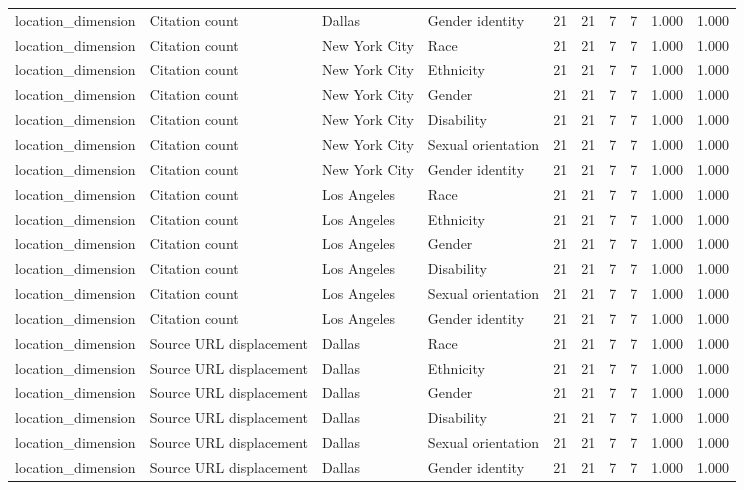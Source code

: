 \begin{longtable}{llllrrrrrr}
location\_dimension & Citation count & Dallas & Gender identity & 21 & 21 & 7 & 7 & 1.000 & 1.000 \\
location\_dimension & Citation count & New York City & Race & 21 & 21 & 7 & 7 & 1.000 & 1.000 \\
location\_dimension & Citation count & New York City & Ethnicity & 21 & 21 & 7 & 7 & 1.000 & 1.000 \\
location\_dimension & Citation count & New York City & Gender & 21 & 21 & 7 & 7 & 1.000 & 1.000 \\
location\_dimension & Citation count & New York City & Disability & 21 & 21 & 7 & 7 & 1.000 & 1.000 \\
location\_dimension & Citation count & New York City & Sexual orientation & 21 & 21 & 7 & 7 & 1.000 & 1.000 \\
location\_dimension & Citation count & New York City & Gender identity & 21 & 21 & 7 & 7 & 1.000 & 1.000 \\
location\_dimension & Citation count & Los Angeles & Race & 21 & 21 & 7 & 7 & 1.000 & 1.000 \\
location\_dimension & Citation count & Los Angeles & Ethnicity & 21 & 21 & 7 & 7 & 1.000 & 1.000 \\
location\_dimension & Citation count & Los Angeles & Gender & 21 & 21 & 7 & 7 & 1.000 & 1.000 \\
location\_dimension & Citation count & Los Angeles & Disability & 21 & 21 & 7 & 7 & 1.000 & 1.000 \\
location\_dimension & Citation count & Los Angeles & Sexual orientation & 21 & 21 & 7 & 7 & 1.000 & 1.000 \\
location\_dimension & Citation count & Los Angeles & Gender identity & 21 & 21 & 7 & 7 & 1.000 & 1.000 \\
location\_dimension & Source URL displacement & Dallas & Race & 21 & 21 & 7 & 7 & 1.000 & 1.000 \\
location\_dimension & Source URL displacement & Dallas & Ethnicity & 21 & 21 & 7 & 7 & 1.000 & 1.000 \\
location\_dimension & Source URL displacement & Dallas & Gender & 21 & 21 & 7 & 7 & 1.000 & 1.000 \\
location\_dimension & Source URL displacement & Dallas & Disability & 21 & 21 & 7 & 7 & 1.000 & 1.000 \\
location\_dimension & Source URL displacement & Dallas & Sexual orientation & 21 & 21 & 7 & 7 & 1.000 & 1.000 \\
location\_dimension & Source URL displacement & Dallas & Gender identity & 21 & 21 & 7 & 7 & 1.000 & 1.000 \\

\end{longtable}
